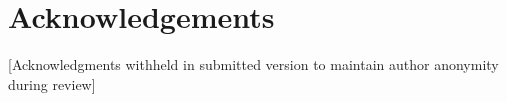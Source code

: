 \documentclass{evolang11}
\begin{document}
%
\section*{Acknowledgements}

[Acknowledgments withheld in submitted version to maintain author anonymity during review]



 
\end{document}
